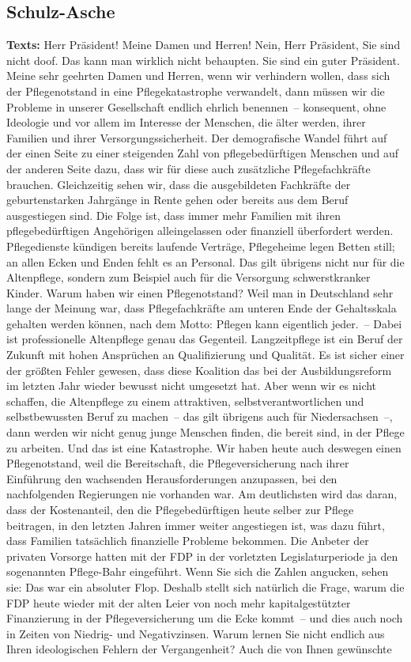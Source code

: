 \documentclass{article}
\begin{document}
\subsection{Schulz-Asche}
\noindent\textbf{Texts:} Herr Präsident! Meine Damen und Herren! Nein, Herr Präsident, Sie sind nicht doof. Das kann man wirklich nicht behaupten. Sie sind ein guter Präsident.  Meine sehr geehrten Damen und Herren, wenn wir verhindern wollen, dass sich der Pflegenotstand in eine Pflegekatastrophe verwandelt, dann müssen wir die Probleme in unserer Gesellschaft endlich ehrlich benennen –  konsequent, ohne Ideologie und vor allem im Interesse der Menschen, die älter werden, ihrer Familien und ihrer Versorgungssicherheit.  Der demografische Wandel führt auf der einen Seite zu einer steigenden Zahl von pflegebedürftigen Menschen und auf der anderen Seite dazu, dass wir für diese auch zusätzliche Pflegefachkräfte brauchen. Gleichzeitig sehen wir, dass die ausgebildeten Fachkräfte der geburtenstarken Jahrgänge in Rente gehen oder bereits aus dem Beruf ausgestiegen sind. Die Folge ist, dass immer mehr Familien mit ihren pflegebedürftigen Angehörigen alleingelassen oder finanziell überfordert werden. Pflegedienste kündigen bereits laufende Verträge, Pflegeheime legen Betten still; an allen Ecken und Enden fehlt es an Personal. Das gilt übrigens nicht nur für die Altenpflege, sondern zum Beispiel auch für die Versorgung schwerstkranker Kinder. Warum haben wir einen Pflegenotstand? Weil man in Deutschland sehr lange der Meinung war, dass Pflegefachkräfte am unteren Ende der Gehaltsskala gehalten werden können, nach dem Motto: Pflegen kann eigentlich jeder. – Dabei ist professionelle Altenpflege genau das Gegenteil. Langzeitpflege ist ein Beruf der Zukunft mit hohen Ansprüchen an Qualifizierung und Qualität.  Es ist sicher einer der größten Fehler gewesen, dass diese Koalition das bei der Ausbildungsreform im letzten Jahr wieder bewusst nicht umgesetzt hat.  Aber wenn wir es nicht schaffen, die Altenpflege zu einem attraktiven, selbstverantwortlichen und selbstbewussten Beruf zu machen – das gilt übrigens auch für Niedersachsen –, dann werden wir nicht genug junge Menschen finden, die bereit sind, in der Pflege zu arbeiten. Und das ist eine Katastrophe.  Wir haben heute auch deswegen einen Pflegenotstand, weil die Bereitschaft, die Pflegeversicherung nach ihrer Einführung den wachsenden Herausforderungen anzupassen, bei den nachfolgenden Regierungen nie vorhanden war. Am deutlichsten wird das daran, dass der Kostenanteil, den die Pflegebedürftigen heute selber zur Pflege beitragen, in den letzten Jahren immer weiter angestiegen ist, was dazu führt, dass Familien tatsächlich finanzielle Probleme bekommen. Die Anbeter der privaten Vorsorge hatten mit der FDP in der vorletzten Legislaturperiode ja den sogenannten Pflege-Bahr eingeführt. Wenn Sie sich die Zahlen angucken, sehen sie: Das war ein absoluter Flop.  Deshalb stellt sich natürlich die Frage, warum die FDP heute wieder mit der alten Leier von noch mehr kapitalgestützter Finanzierung in der Pflegeversicherung um die Ecke kommt – und dies auch noch in Zeiten von Niedrig- und Negativzinsen. Warum lernen Sie nicht endlich aus Ihren ideologischen Fehlern der Vergangenheit?  Auch die von Ihnen gewünschte 
\end{document}
